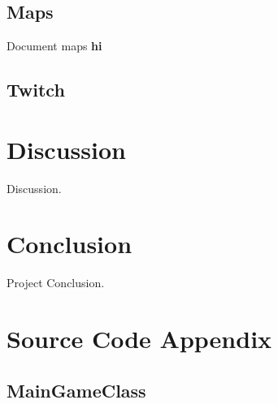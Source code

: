 \documentclass[12p]{article}
\begin{document}

\subsection{Maps}

Document maps \textbf{hi}


\subsection{Twitch} \label{Twitch}


\newpage
\section{Discussion}

Discussion.


\newpage
\section{Conclusion}

Project Conclusion.


\newpage
\printbibliography[heading=bibintoc,title={References}]


\newpage
\appendix
\section{Source Code Appendix}

\subsection{MainGameClass} \label{MainGameClass.java}
\inputminted[linenos,breaklines]{java}{code/MainGameClass.java}
\end{document}
